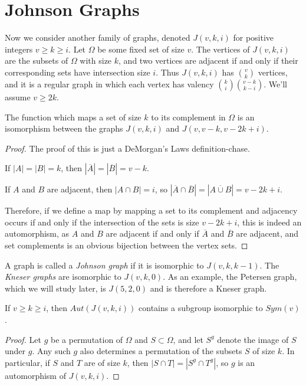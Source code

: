 \section*{Johnson Graphs}

Now we consider another family of graphs, denoted $J(v,k,i)$ for positive integers $v\geq k\geq i$.  Let $\Omega$ be some fixed set of size $v$.  The vertices of $J(v,k,i)$ are the subsets of $\Omega$ with size $k$, and two vertices are adjacent if and only if their corresponding sets have intersection size $i$.  Thus $J(v,k,i)$ has $\binom{v}{k}$ vertices, and it is a regular graph in which each vertex has valency $\binom{k}{i}\binom{v-k}{k-i}$.  We'll assume $v\geq 2k$.

\begin{lemma}
{The function which maps a set of size $k$ to its complement in $\Omega$ is an isomorphism between the graphs $J(v,k,i)$ and $J(v,v-k,v-2k+i)$.}
\end{lemma}
\begin{proof}
	The proof of this is just a DeMorgan's Laws definition-chase.  
	
	If $|A|=|B|=k$, then $|\overline{A}|=|\overline{B}|=v-k$.
	
	If $A$ and $B$ are adjacent, then $|A\cap B|=i$, so $|\overline{A}\cap\overline{B}| = |\overline{A\cup B}| = v-2k+i$.
	
	Therefore, if we define a map by mapping a set to its complement and adjacency occurs if and only if the intersection of the sets is size $v-2k+i$, this is indeed an automorphism, as $A$ and $B$ are adjacent if and only if $\overline{A}$ and $\overline{B}$ are adjacent, and set complements is an obvious bijection between the vertex sets.
	
	
	
\end{proof}

A graph is called a \textit{Johnson graph} if it is isomorphic to $J(v,k,k-1)$.  The \textit{Kneser graphs} are isomorphic to $J(v,k,0)$.  As an example, the Petersen graph, which we will study later, is $J(5,2,0)$ and is therefore a Kneser graph.

\begin{lemma}
	{If $v\geq k \geq i$, then $Aut(J(v,k,i))$ contains a subgroup isomorphic to $Sym(v)$.}
\end{lemma}

\begin{proof}
	Let $g$ be a permutation of $\Omega$ and $S\subset \Omega$, and let $S^g$ denote the image of $S$ under $g$.  Any such $g$ also determines a permutation of the subsets $S$ of size $k$.  In particular, if $S$ and $T$ are of size $k$, then $|S\cap T|=|S^g\cap T^g|$, so $g$ is an automorphism of $J(v,k,i)$.
\end{proof}

